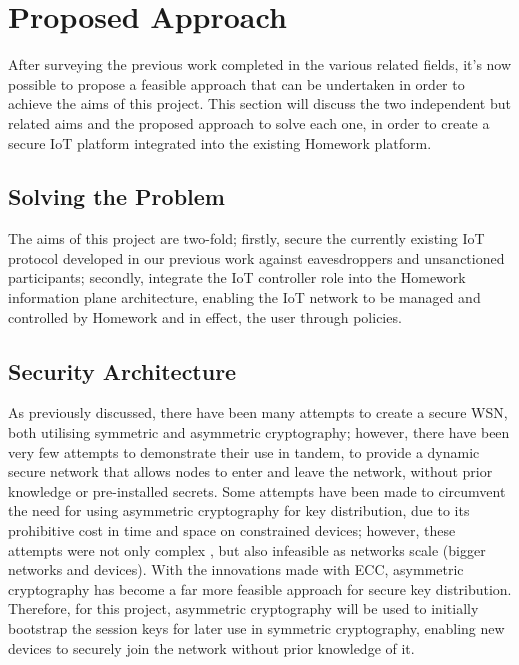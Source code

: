 \documentclass{mprop}
\begin{document}
\section{Proposed Approach}

After surveying the previous work completed in the various related fields, it's now possible to propose a feasible approach that can be undertaken in order to achieve the aims of this project. This section will discuss the two independent but related aims and the proposed approach to solve each one, in order to create a secure IoT platform integrated into the existing Homework platform.


\subsection{Solving the Problem} %
\label{sub:solving_the_problem}
The aims of this project are two-fold; firstly, secure the currently existing IoT protocol developed in our previous work against eavesdroppers and unsanctioned participants; secondly, integrate the IoT controller role into the Homework information plane architecture, enabling the IoT network to be managed and controlled by Homework and in effect, the user through policies.

\subsection{Security Architecture} %
\label{sub:security_architecture}
As previously discussed, there have been many attempts to create a secure WSN, both utilising symmetric and asymmetric cryptography; however, there have been very few attempts to demonstrate their use in tandem, to provide a dynamic secure network that allows nodes to enter and leave the network, without prior knowledge or pre-installed secrets. Some attempts have been made to circumvent the need for using asymmetric cryptography for key distribution, due to its prohibitive cost in time and space on constrained devices; however, these attempts were not only complex \cite{TinyPK}, but also infeasible as networks scale (bigger networks and devices)\cite{MessageBottle}. With the innovations made with ECC, asymmetric cryptography has become a far more feasible approach for secure key distribution. Therefore, for this project, asymmetric cryptography will be used to initially bootstrap the session keys for later use in symmetric cryptography, enabling new devices to securely join the network without prior knowledge of it.
\end{document}
